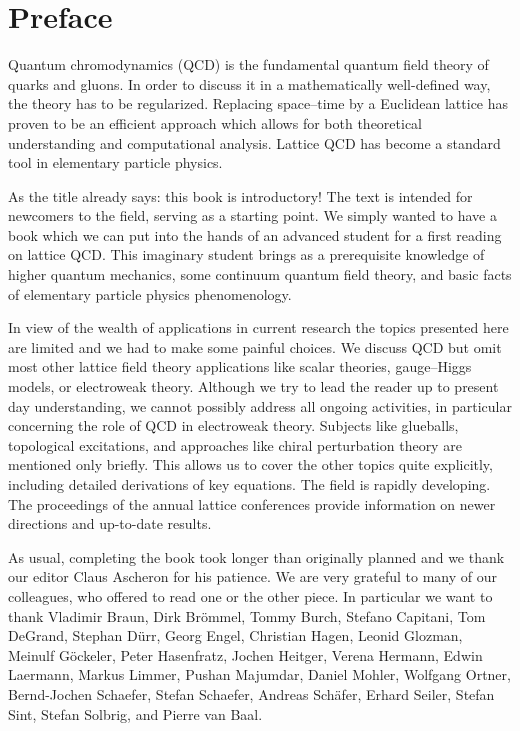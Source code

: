 
\chapter*{Preface}

Quantum chromodynamics (QCD) is the fundamental quantum field theory
of quarks and gluons. In order to discuss it in a mathematically
well-defined way, the theory has to be regularized. Replacing
space--time by a Euclidean lattice has proven to be an efficient
approach which allows for both theoretical understanding and
computational analysis. Lattice QCD has become a standard tool in
elementary particle physics.

As the title already says: this book is introductory! The text is
intended for newcomers to the field, serving as a starting point. We
simply wanted to have a book which we can put into the hands of an
advanced student for a first reading on lattice QCD. This imaginary
student brings as a prerequisite knowledge of higher quantum
mechanics, some continuum quantum field theory, and basic facts of
elementary particle physics phenomenology.

In view of the wealth of applications in current research the topics
presented here are limited and we had to make some painful choices. We
discuss QCD but omit most other lattice field theory applications like
scalar theories, gauge--Higgs models, or electroweak theory. Although
we try to lead the reader up to present day understanding, we cannot
possibly address all ongoing activities, in particular concerning the
role of QCD in electroweak theory. Subjects like glueballs, topological
excitations, and approaches like chiral perturbation theory are
mentioned only briefly. This allows us to cover the other topics quite
explicitly, including detailed derivations of key equations. The field
is rapidly developing. The proceedings of the annual lattice
conferences provide information on newer directions and up-to-date
results.

As usual, completing the book took longer than originally planned and
we thank our editor Claus Ascheron for his patience. We are very
grateful to many of our colleagues, who offered to read one or the
other piece. In particular we want to thank Vladimir Braun,
Dirk Br\"ommel, Tommy Burch, Stefano Capitani, Tom DeGrand,
Stephan D\"urr, Georg Engel, Christian Hagen, Leonid Glozman,
Meinulf G\"ockeler, Peter Hasenfratz, Jochen Heitger, Verena Hermann,
Edwin Laermann, Markus Limmer, Pushan Majumdar, Daniel Mohler,
Wolfgang Ortner, Bernd-Jochen Schaefer, Stefan Schaefer, Andreas
Sch\"afer, Erhard Seiler, Stefan Sint, Stefan Solbrig, and Pierre van
Baal.

